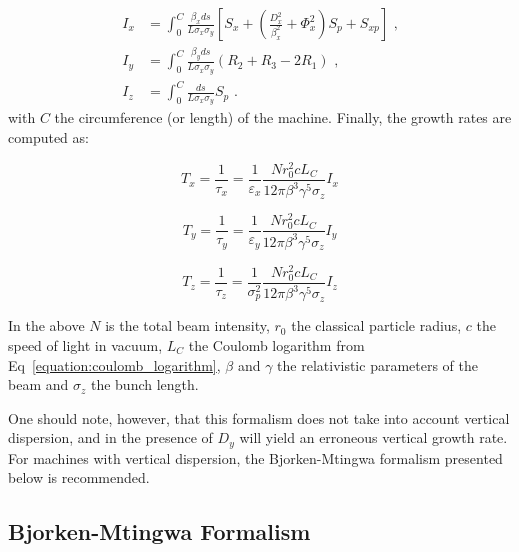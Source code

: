 \begin{equation}
    \begin{aligned}
        I_x &= \int_0^C \frac{\beta_x ds}{L \sigma_x \sigma_y} \left[S_x + \left( \frac{D_x^{2}}{\beta_x^{2}} + \Phi_x^{2} \right) S_p + S_{xp} \right] \text{ ,} \\
        I_y &= \int_0^C \frac{\beta_y ds}{L \sigma_x \sigma_y} \left(R_2 + R_3 - 2 R_1\right) \text{ ,} \\
        I_z &= \int_0^C \frac{ds}{L \sigma_x \sigma_y} S_p \text{ .}
    \end{aligned}
    \label{equation:nagaitsev_integrals}
\end{equation}
with \(C\) the circumference (or length) of the machine.
Finally, the growth rates are computed as:

\begin{equation}
    \boxed{T_x = \frac{1}{\tau_x} = \frac{1}{\varepsilon_x} \frac{N r_0^{2} c L_C}{12 \pi \beta^3 \gamma^5 \sigma_z} I_x}
    \label{equation:nagaitsev_tx}
\end{equation}

\begin{equation}
    \boxed{T_y = \frac{1}{\tau_y} = \frac{1}{\varepsilon_y} \frac{N r_0^{2} c L_C}{12 \pi \beta^3 \gamma^5 \sigma_z} I_y}
    \label{equation:nagaitsev_ty}
\end{equation}

\begin{equation}
    \boxed{T_z = \frac{1}{\tau_z} = \frac{1}{\sigma_p^{2}} \frac{N r_0^{2} c L_C}{12 \pi \beta^3 \gamma^5 \sigma_z} I_z}
    \label{equation:nagaitsev_tz}
\end{equation}

In the above \(N\) is the total beam intensity, \(r_0\) the classical particle radius, \(c\) the speed of light in vacuum, \(L_C\) the Coulomb logarithm from Eq~\eqref{equation:coulomb_logarithm}, \(\beta\) and \(\gamma\) the relativistic parameters of the beam and \(\sigma_z\) the bunch length.
\newline

One should note, however, that this formalism does not take into account vertical dispersion, and in the presence of \(D_y\) will yield an erroneous vertical growth rate.
For machines with vertical dispersion, the Bjorken-Mtingwa formalism presented below is recommended.

\subsection{Bjorken-Mtingwa Formalism}

